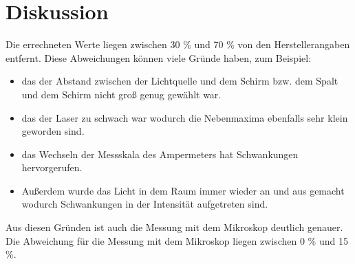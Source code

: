 \section{Diskussion}
\label{sec:Diskussion}
Die errechneten Werte liegen zwischen 30 \% und 70 \% von den Herstellerangaben entfernt. Diese Abweichungen können viele Gründe haben, zum Beispiel:
\begin{itemize}
\item das der Abstand zwischen der Lichtquelle und dem Schirm bzw. dem Spalt und dem Schirm nicht groß genug gewählt war.
\item das der Laser zu schwach war wodurch die Nebenmaxima ebenfalls sehr klein geworden sind.
\item das Wechseln der Messskala des Ampermeters hat Schwankungen hervorgerufen.
\item Außerdem wurde das Licht in dem Raum immer wieder an und aus gemacht wodurch Schwankungen in der Intensität aufgetreten sind.
\end{itemize}
Aus diesen Gründen ist auch die Messung mit dem Mikroskop deutlich genauer.
Die Abweichung für die Messung mit dem Mikroskop liegen zwischen 0 \% und 15 \%.
